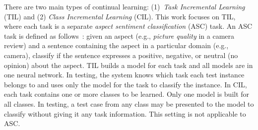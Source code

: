 \documentclass[11pt]{article}
\begin{document}
\begin{table}
    \centering
    
    \caption{Tasks 2 and 3 have shareable \underline{k}nowledge to \underline{t}ransfer (KT) to the new task, whereas Task 1 has specific knowledge that is expected to be isolated from the new task to avoid \underline{c}atastrophic \underline{f}orgetting (CF) (although they use the same word).
Note that here we use only one sentence to represent a task, but each task actually represents a domain with all its sentences.}
    \label{tbl:example}
    \vspace{-3mm}
\end{table}

There are two main types of continual learning: (1)~\textit{Task Incremental Learning} (TIL) and (2) \textit{Class Incremental Learning} (CIL). This work focuses on TIL, where each task is a separate \textit{aspect sentiment classification} (ASC) task. An ASC task is defined as follows~\cite{liu2015sentiment}: given an aspect (e.g., \textit{picture quality} in a camera review) and a sentence containing the aspect in a particular domain (e.g., camera), classify if the sentence expresses a positive, negative, or neutral (no opinion) about the aspect. 
{\color{black}TIL builds a model for each task and all models are in one neural network. 
In testing, the system knows which task each test instance belongs to and uses only the model for the task to classify the instance. In CIL, each task contains one or more classes to be learned. Only one model is built for all classes.} In testing, a test case from any class may be presented to the model to classify without giving it any task information. This setting is not applicable to ASC. 
\end{document}
